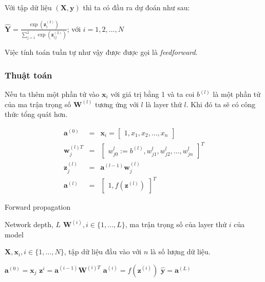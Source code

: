 Với tập dữ liệu $(\textbf{X},\textbf{y} )$ thì ta có đầu ra dự đoán như sau:  
\begin{center}

	$\widehat{\textbf{Y}} =\frac{\exp({\textbf{z}^{(2)}_i})}{\sum^{2}_{j=1}{\exp({\textbf{z}^{(2)}_{ij}})}}$; với $i=1,2,...,N$ 

\end{center}
Việc tính toán tuần tự như vậy được được gọi là \textit{feedforward}.
\subsubsection{ Thuật toán}
\label{subsec:feedforward}
\hspace{5mm} Nếu ta thêm một phần tử vào $\textbf{x}_i$ với giá trị bằng 1 và ta coi $b^{(l)}$ là một phần tử của ma trận trọng số $\textbf{W}^{(l)}$ tương ứng với $l$ là layer thứ $l$. Khi đó ta sẽ có công thức tổng quát hơn.

\begin{eqnarray*}
\textbf{a}^{(0)}	&=&		\textbf{x}_i = \begin{bmatrix}
1,x_1,x_2,\ldots,x_n
\end{bmatrix} \\
\textbf{w}^{(l)T}_j &=& \begin{bmatrix}
w^{l}_{j0} := b^{(l)}, w^{l}_{j1}, w^{l}_{j2},\ldots, w^{l}_{jn}
\end{bmatrix}^T\\
\textbf{z}^{(l)}_j &=& \textbf{a}^{(l-1)}\textbf{w}^{(l)}_j\\
\textbf{a}^{(l)} &=& \begin{bmatrix}
1, f(\textbf{z}^{(l)})
\end{bmatrix}^T
\end{eqnarray*}



\begin{algorithm}[H]
\caption{Forward propagation }\label{al:forward}
\begin{algorithmic}[1]
\REQUIRE Network depth, $L$
\REQUIRE $\textbf{W}^{(i)}, i \in \{1,\ldots,L\}$, ma trận trọng số của layer thứ $i$ của model

\REQUIRE $\textbf{X}, \textbf{x}_i, i \in \{1,\ldots,N\} $, tập dữ liệu đầu vào với $n$ là số lượng dữ liệu.
	
	\STATE $\textbf{a}^{(0)} = \textbf{x}_j$
		\STATE $\textbf{z}^{i}=\textbf{a}^{(i-1)} \textbf{W}^{(i)T}$
		\STATE $\textbf{a}^{(i)}=f(\textbf{z}^{(i)})$
\ENDFOR
\STATE $\widehat{\textbf{y}} = \textbf{a}^{(L)}$
\ENDFOR
\end{algorithmic}
\end{algorithm}

